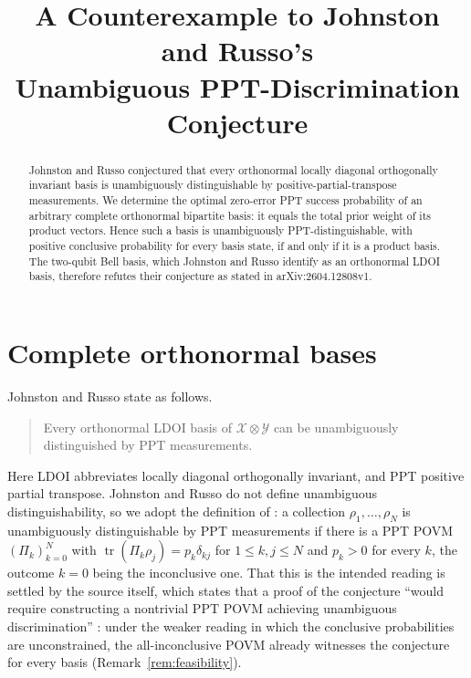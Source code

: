 \documentclass[11pt]{amsart}
\title[Counterexample to an LDOI conjecture]
{A Counterexample to Johnston and Russo's\\
Unambiguous PPT-Discrimination Conjecture}
\date{}
\theoremstyle{remark}
\begin{document}
\begin{abstract}
Johnston and Russo conjectured that every orthonormal locally diagonal
orthogonally invariant basis is unambiguously distinguishable by
positive-partial-transpose measurements. We determine the optimal zero-error
PPT success probability of an arbitrary complete orthonormal bipartite basis:
it equals the total prior weight of its product vectors. Hence such a basis is
unambiguously PPT-distinguishable, with positive conclusive probability for
every basis state, if and only if it is a product basis. The two-qubit Bell basis,
which Johnston and Russo identify as an orthonormal LDOI basis, therefore
refutes their conjecture as stated in arXiv:2604.12808v1.
\end{abstract}

\maketitle

\section{Complete orthonormal bases}

Johnston and Russo state \cite[Conjecture~1]{JohnstonRusso} as follows.

\begin{quote}
Every orthonormal LDOI basis of $\mathcal X\otimes\mathcal Y$ can be
unambiguously distinguished by PPT measurements.
\end{quote}

\noindent
Here LDOI abbreviates locally diagonal orthogonally invariant, and PPT
positive partial transpose. Johnston and Russo do not define unambiguous
distinguishability, so we adopt the definition of \cite[Sec.~II]{YuDuanYing}:
a collection $\rho_1,\ldots,\rho_N$ is unambiguously distinguishable by PPT
measurements if there is a PPT POVM $(\Pi_k)_{k=0}^{N}$ with
$\operatorname{tr}(\Pi_k\rho_j)=p_k\delta_{kj}$ for $1\leq k,j\leq N$ and
$p_k>0$ for every $k$, the outcome $k=0$ being the inconclusive one. That this
is the intended reading is settled by the source itself, which states that a
proof of the conjecture ``would require constructing a nontrivial PPT POVM
achieving unambiguous discrimination'' \cite{JohnstonRusso}: under the weaker
reading in which the conclusive probabilities are unconstrained, the
all-inconclusive POVM already witnesses the conjecture for every basis
(Remark~\ref{rem:feasibility}).
\end{document}
